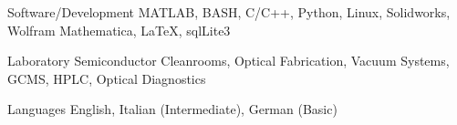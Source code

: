 

\begin{cvskills}

  \cvskill
    {Software/Development} %
    {MATLAB, BASH, C/C++, Python, Linux, Solidworks, Wolfram Mathematica, \LaTeX, sqlLite3} %

  \cvskill
    {Laboratory} %
    {Semiconductor Cleanrooms, Optical Fabrication, Vacuum Systems, GCMS, HPLC, Optical Diagnostics} %

  \cvskill
    {Languages} %
    {English, Italian (Intermediate), German (Basic)} %

\end{cvskills}
